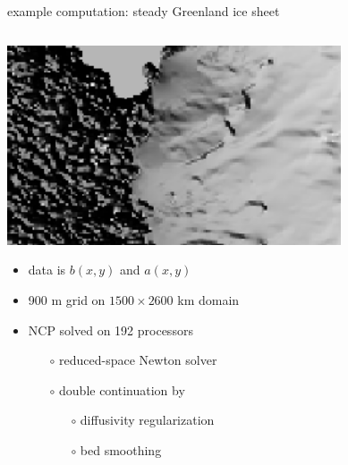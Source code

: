 \documentclass[hide notes,intlimits]{beamer}
\begin{document}
\begin{frame}{example computation: steady Greenland ice sheet}
\begin{columns}
\begin{column}{0.6\textwidth}
\includegraphics[width=1.05\textwidth]{insetinset}
\vfill
\begin{itemize}
\small
\item data is $b(x,y)$ and $a(x,y)$
\item 900 m grid on $1500\times 2600$ km domain
\item NCP solved on 192 processors
  \begin{itemize}
  \scriptsize
  \item[$\circ$] reduced-space Newton solver
  \item[$\circ$] double continuation by
    \begin{itemize}
    \scriptsize
    \item[$\circ$] diffusivity regularization
    \item[$\circ$] bed smoothing
    \end{itemize}
  \end{itemize}
\end{itemize}
\end{column}
\begin{column}{0.4\textwidth}

\end{column}
\end{columns}
\end{frame}
\end{document}
